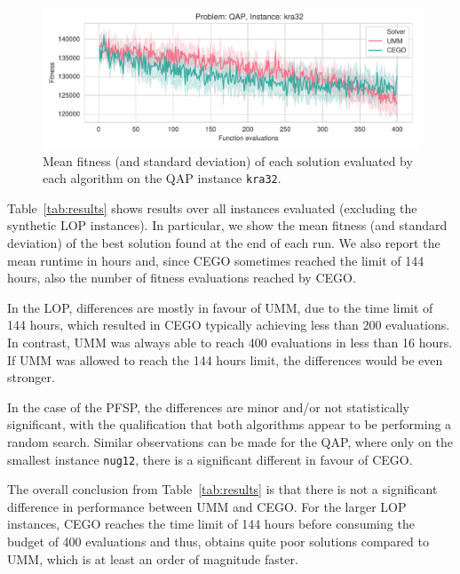\documentclass[runningheads]{llncs}
\begin{document}
\begin{figure}[tp]
  \centering%
  \includegraphics[width=\textwidth]{../img/fitness_real_qap_kra32_dat}
    \caption{Mean fitness  (and standard deviation)  of each solution evaluated by each algorithm on the QAP instance \texttt{kra32}.\label{fig:kra32}}
\end{figure}

Table~\ref{tab:results} shows results over all instances evaluated (excluding
the synthetic LOP instances). In particular, we show the mean fitness (and
standard deviation) of the best solution found at the end of each run. We also report the mean runtime in hours and, since CEGO sometimes reached the limit of 144 hours, also the number of fitness evaluations reached by CEGO.

In the LOP, differences are mostly in favour of UMM, due to the time limit of
144 hours, which resulted in CEGO typically achieving less than 200
evaluations. In contrast, UMM was always able to reach 400 evaluations in less
than 16 hours. If UMM was allowed to reach the 144 hours limit, the differences
would be even stronger.

In the case of the PFSP, the differences are minor and/or not statistically
significant, with the qualification that both algorithms appear to be
performing a random search. Similar observations can be made for the QAP, where
only on the smallest instance \texttt{nug12}, there is a significant different
in favour of CEGO.

The overall conclusion from Table~\ref{tab:results} is that there is not a
significant difference in performance between UMM and CEGO. For the larger LOP
instances, CEGO reaches the time limit of 144 hours before consuming the budget
of 400 evaluations and thus, obtains quite poor solutions compared to UMM,
which is at least an order of magnitude faster.
\end{document}

